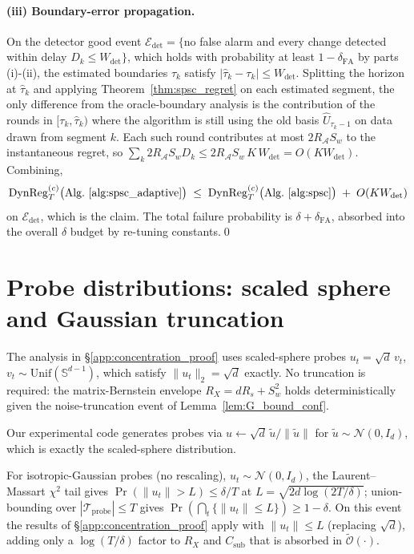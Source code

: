 \documentclass{article}
\newcommand{\cA}{\mathcal{A}}
\newcommand{\cTprobe}{\mathcal{T}_{\mathrm{probe}}}
\newcommand{\tilO}{\widetilde{\mathcal{O}}}
\newcommand{\DynReg}{\mathrm{DynReg}}
\begin{document}
\paragraph{(iii) Boundary-error propagation.}
On the detector good event
$\mathcal E_{\mathrm{det}}=\bigl\{$no false alarm and every change
detected within delay $D_k\le W_{\mathrm{det}}\bigr\}$, which holds
with probability at least $1-\delta_{\mathrm{FA}}$ by parts (i)-(ii),
the estimated boundaries $\widehat\tau_k$ satisfy
$|\widehat\tau_k-\tau_k|\le W_{\mathrm{det}}$. Splitting the horizon
at $\widehat\tau_k$ and applying Theorem~\ref{thm:spsc_regret} on
each estimated segment, the only difference from the oracle-boundary
analysis is the contribution of the rounds in
$[\tau_k,\widehat\tau_k)$ where the algorithm is still using the old
basis $\widehat U_{\tau_k-1}$ on data drawn from segment $k$. Each
such round contributes at most $2R_\cA S_w$ to the instantaneous
regret, so
$\sum_k 2R_\cA S_w D_k\le 2R_\cA S_w\,K\,W_{\mathrm{det}}=O(K W_{\mathrm{det}})$.
Combining,
\[
\DynReg_T^{(c)}\bigl(\text{Alg.~\ref{alg:spsc_adaptive}}\bigr)
\;\le\;
\DynReg_T^{(c)}\bigl(\text{Alg.~\ref{alg:spsc}}\bigr)
\;+\; O(K W_{\mathrm{det}})
\]
on $\mathcal E_{\mathrm{det}}$, which is the claim. The total
failure probability is $\delta+\delta_{\mathrm{FA}}$, absorbed into
the overall $\delta$ budget by re-tuning constants.\qed

\section{Probe distributions: scaled sphere and Gaussian truncation}
\label{app:truncation}

The analysis in \S\ref{app:concentration_proof} uses scaled-sphere
probes $u_t = \sqrt d\,v_t$, $v_t\sim\mathrm{Unif}(\mathbb S^{d-1})$,
which satisfy $\|u_t\|_2 = \sqrt d$ exactly. No truncation is
required: the matrix-Bernstein envelope $R_X = d R_s + S_w^2$ holds
deterministically given the noise-truncation event of
Lemma~\ref{lem:G_bound_conf}.

Our experimental code generates probes via $u\leftarrow\sqrt d\,\tilde
u/\|\tilde u\|$ for $\tilde u\sim\mathcal N(0,I_d)$, which is exactly
the scaled-sphere distribution.

For isotropic-Gaussian probes (no rescaling),
$u_t\sim\mathcal N(0,I_d)$, the Laurent--Massart $\chi^2$ tail
\citep[Lem.~1]{laurent2000adaptive} gives
$\Pr(\|u_t\|>L)\le\delta/T$ at $L=\sqrt{2d\log(2T/\delta)}$;
union-bounding over $|\cTprobe|\le T$ gives
$\Pr(\bigcap_t\{\|u_t\|\le L\})\ge 1-\delta$. On this event the
results of \S\ref{app:concentration_proof} apply with $\|u_t\|\le L$
(replacing $\sqrt d$), adding only a $\log(T/\delta)$ factor to $R_X$
and $C_{\mathrm{sub}}$ that is absorbed in $\tilO(\cdot)$.
\end{document}
